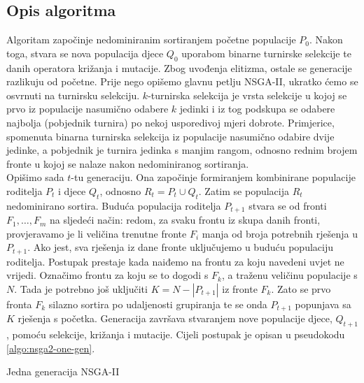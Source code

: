 \documentclass[times, utf8, zavrsni, numeric]{fer}
\begin{document}
\subsection{Opis algoritma}
Algoritam započinje nedominiranim sortiranjem početne populacije $P_0$. Nakon toga, stvara se nova populacija djece $Q_0$ uporabom binarne turnirske selekcije te danih operatora križanja i mutacije. Zbog uvođenja elitizma, ostale se generacije razlikuju od početne. Prije nego opišemo glavnu petlju NSGA-II, ukratko ćemo se osvrnuti na turnirsku selekciju. $k$-turnirska selekcija je vrsta selekcije u kojoj se prvo iz populacije nasumično odabere $k$ jedinki i iz tog podskupa se odabere najbolja (pobjednik turnira) po nekoj usporedivoj mjeri dobrote. Primjerice, spomenuta binarna turnirska selekcija iz populacije nasumično odabire dvije jedinke, a pobjednik je turnira jedinka s manjim rangom, odnosno rednim brojem fronte u kojoj se nalaze nakon nedominiranog sortiranja.\\
Opišimo sada $t$-tu generaciju. Ona započinje formiranjem kombinirane populacije roditelja $P_t$ i djece $Q_t$, odnosno $R_t = P_t \cup Q_t$. Zatim se populacija $R_t$ nedominirano sortira. Buduća populacija roditelja $P_{t+1}$ stvara se od fronti $F_1,\dots, F_m$ na sljedeći način: redom, za svaku frontu iz skupa danih fronti, provjeravamo je li veličina trenutne fronte $F_i$ manja od broja potrebnih rješenja u $P_{t+1}$. Ako jest, sva rješenja iz dane fronte uključujemo u buduću populaciju roditelja. Postupak prestaje kada naiđemo na frontu za koju navedeni uvjet ne vrijedi. Označimo frontu za koju se to dogodi s $F_k$, a traženu veličinu populacije s $N$. Tada je potrebno još uključiti $K = N - \left\vert{P_{t+1}}\right\vert$ iz fronte $F_k$. Zato se prvo fronta $F_k$ silazno sortira po udaljenosti grupiranja  te se onda $P_{t+1}$ popunjava sa $K$ rješenja s početka. Generacija završava stvaranjem nove populacije djece, $Q_{t+1}$, pomoću selekcije, križanja i mutacije. Cijeli postupak je opisan u pseudokodu \ref{algo:nsga2-one-gen}.

\begin{algorithm}
\caption{Jedna generacija NSGA-II}
\label{algo:nsga2-one-gen}
\begin{algorithmic}
\ENDWHILE
{}
\end{algorithmic}
\end{algorithm}
\end{document}
